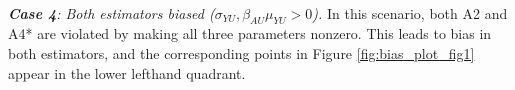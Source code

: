 \documentclass[11pt]{article}
\begin{document}
\\
\textit{\textbf{Case 4}:  Both estimators biased ($\sigma_{YU}, \beta_{AU} \mu_{YU} > 0$).} In this scenario, both A2 and A4* are violated by making all three parameters nonzero. This leads to bias in both estimators, and the corresponding points in Figure \ref{fig:bias_plot_fig1} appear in the lower lefthand quadrant.






\end{document}
